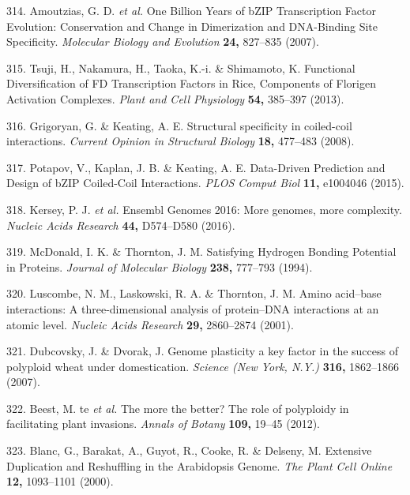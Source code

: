 \documentclass[12pt,]{book}
\begin{document}
\hypertarget{ref-amoutzias_one_2007}{}
314. Amoutzias, G. D. \emph{et al.} One Billion Years of bZIP
Transcription Factor Evolution: Conservation and Change in Dimerization
and DNA-Binding Site Specificity. \emph{Molecular Biology and Evolution}
\textbf{24,} 827--835 (2007).

\hypertarget{ref-tsuji_functional_2013}{}
315. Tsuji, H., Nakamura, H., Taoka, K.-i. \& Shimamoto, K. Functional
Diversification of FD Transcription Factors in Rice, Components of
Florigen Activation Complexes. \emph{Plant and Cell Physiology}
\textbf{54,} 385--397 (2013).

\hypertarget{ref-grigoryan_structural_2008}{}
316. Grigoryan, G. \& Keating, A. E. Structural specificity in
coiled-coil interactions. \emph{Current Opinion in Structural Biology}
\textbf{18,} 477--483 (2008).

\hypertarget{ref-potapov_data_driven_2015}{}
317. Potapov, V., Kaplan, J. B. \& Keating, A. E. Data-Driven Prediction
and Design of bZIP Coiled-Coil Interactions. \emph{PLOS Comput Biol}
\textbf{11,} e1004046 (2015).

\hypertarget{ref-kersey_ensembl_2016}{}
318. Kersey, P. J. \emph{et al.} Ensembl Genomes 2016: More genomes,
more complexity. \emph{Nucleic Acids Research} \textbf{44,} D574--D580
(2016).

\hypertarget{ref-mcdonald_satisfying_1994}{}
319. McDonald, I. K. \& Thornton, J. M. Satisfying Hydrogen Bonding
Potential in Proteins. \emph{Journal of Molecular Biology} \textbf{238,}
777--793 (1994).

\hypertarget{ref-luscombe_amino_2001}{}
320. Luscombe, N. M., Laskowski, R. A. \& Thornton, J. M. Amino
acid--base interactions: A three-dimensional analysis of protein--DNA
interactions at an atomic level. \emph{Nucleic Acids Research}
\textbf{29,} 2860--2874 (2001).

\hypertarget{ref-dubcovsky_genome_2007}{}
321. Dubcovsky, J. \& Dvorak, J. Genome plasticity a key factor in the
success of polyploid wheat under domestication. \emph{Science (New York,
N.Y.)} \textbf{316,} 1862--1866 (2007).

\hypertarget{ref-te_beest_more_2012}{}
322. Beest, M. te \emph{et al.} The more the better? The role of
polyploidy in facilitating plant invasions. \emph{Annals of Botany}
\textbf{109,} 19--45 (2012).

\hypertarget{ref-blanc_extensive_2000}{}
323. Blanc, G., Barakat, A., Guyot, R., Cooke, R. \& Delseny, M.
Extensive Duplication and Reshuffling in the Arabidopsis Genome.
\emph{The Plant Cell Online} \textbf{12,} 1093--1101 (2000).
\end{document}
